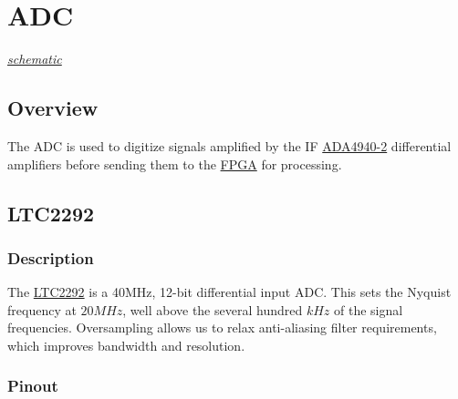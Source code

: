 \section{ADC}
\label{sec:adc}
\textit{\hyperlink{schematic.4}{schematic}}

\subsection{Overview}
\label{sec:adc-overview}

The ADC is used to digitize signals amplified by the IF \hyperref[sec:ada4940-2]{ADA4940-2}
differential amplifiers before sending them to the \hyperref[sec:xc7a15t-ftg256]{FPGA} for
processing.

\subsection{LTC2292}
\label{sec:ltc2292}

\subsubsection{Description}
\label{sec:ltc2292-description}

The \href{http://www.analog.com/media/en/technical-documentation/data-sheets/229321fa.pdf}{LTC2292}
is a 40MHz, 12-bit differential input ADC\@. This sets the Nyquist frequency at $20 \si{MHz}$, well
above the several hundred $\si{kHz}$ of the signal frequencies. Oversampling allows us to relax
anti-aliasing filter requirements, which improves bandwidth and resolution.

\subsubsection{Pinout}
\label{sec:ltc2292-pinout}

